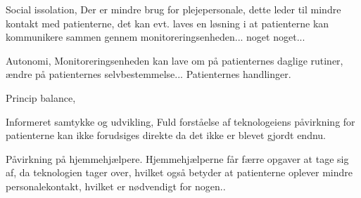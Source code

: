 Social issolation, 
Der er mindre brug for plejepersonale, dette leder til mindre kontakt med patienterne, det kan evt. laves en løsning i at patienterne kan kommunikere sammen gennem monitoreringsenheden... noget noget...

Autonomi, 
Monitoreringsenheden kan lave om på patienternes daglige rutiner, ændre på patienternes selvbestemmelse... Patienternes handlinger.

Princip balance, 


Informeret samtykke og udvikling, 
Fuld forståelse af teknologeiens påvirkning for patienterne kan ikke forudsiges direkte da det ikke er blevet gjordt endnu.

Påvirkning på hjemmehjælpere.
Hjemmehjælperne får færre opgaver at tage sig af, da teknologien tager over, hvilket også betyder at patienterne oplever mindre personalekontakt, hvilket er nødvendigt for nogen..

\citep{Mittelstand2011}